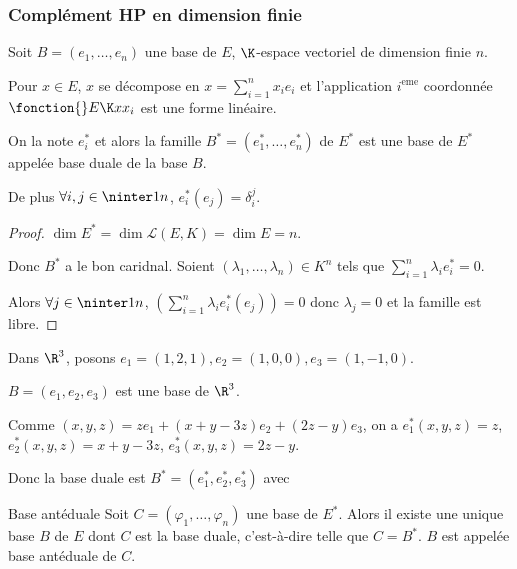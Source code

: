\subsubsection{Complément HP en dimension finie}

\begin{definition}{}{}

    Soit $B = (e_1, \dots, e_n)$ une base de $E$, $\K$-espace vectoriel de dimension finie $n$. 

    Pour $x\in E$, $x$ se décompose en $x = \sum_{i=1}^n x_i e_i$ et l'application $i^{\text{eme}}$ coordonnée
    $\fonction{} E \K x {x_i}$ est une forme linéaire. 

    On la note $e_i^*$ et alors la famille $B^* = (e_1^*, \dots, e_n^*)$ de $E^*$ est une base de $E^*$
    appelée base duale de la base $B$.

    De plus $\forall i, j \in \ninter 1 n$, $e_i^*(e_j) = \delta_i^j$.
\end{definition}

\begin{proof}
    $\dim E^* = \dim \mathscr L (E, K) = \dim E = n$. 

    Donc $B^*$ a le bon caridnal. Soient $(\lambda_1, \dots, \lambda_n) \in K^n$ tels que
    $\sum_{i=1}^n \lambda_i e_i^* = 0$.

    Alors $\forall j \in \ninter 1 n$, $\left( \sum_{i=1}^n \lambda_i e_i^*(e_j) \right) = 0$ donc
    $\lambda_j = 0$ et la famille est libre. 
    
\end{proof}

\begin{exemple}
    Dans $\R^3$, posons $e_1 = (1, 2, 1), e_2 = (1, 0, 0) , e_3 = (1, -1, 0)$.

    $B = (e_1, e_2, e_3)$ est une base de $\R^3$.

    Comme $(x, y, z ) = z e_1 + (x + y - 3z) e_2 + (2z - y) e_3$, on a
    $e_1^*(x, y, z) = z$, $e_2^*(x, y, z) = x + y - 3z$, $e_3^*(x, y, z) = 2z - y$.

    Donc la base duale est $B^* = (e_1^*, e_2^*, e_3^*)$ avec
\end{exemple}

\begin{theoreme}{Base antéduale}{}
    Soit $C = (\varphi_1, \dots, \varphi_n)$ une base de $E^*$. Alors il existe une unique base $B$ de $E$ dont $C$
    est la base duale, c'est-à-dire telle que $C = B^*$. 
    $B$ est appelée base antéduale de $C$.
    
\end{theoreme}

